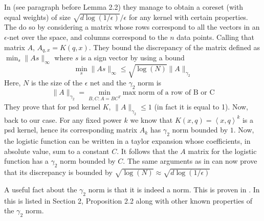 \documentclass{article} %
\newcommand{\ip}[1]{\left \langle #1 \right \rangle}
\newcommand{\eps}{\epsilon}
\begin{document}
In \cite{DBLP:journals/corr/abs-1802-01751} (see paragraph before Lemma 2.2) they manage to obtain a coreset (with equal weights) of size $\sqrt{d \log(1/\eps)}/\eps$ for any kernel with certain properties. The do so by considering a matrix whose rows correspond to all the vectors in an $\eps$-net over the space, and columns correspond to the $n$ data points. Calling that matrix $A$, $A_{q,x} = K(q,x)$. They bound the discrepancy of the matrix defined as $\min_s \|As\|_\infty$ where $s$ is a sign vector by using a bound 
$$ \min_s \|As\|_\infty \leq \sqrt{\log(N)} \|A\|_{\gamma_2} $$
Here, $N$ is the size of the $\eps$ net and the $\gamma_2$ norm is 
$$ \|A\|_{\gamma_2} = \min_{B,C: A=BC^T} \text{max norm of a row of B or C}$$
They prove that for psd kernel $K$, $\|A\|_{\gamma_2} \leq 1$ (in fact it is equal to 1). Now, back to our case. For any fixed power $k$ we know that $K(x,q)=\ip{x,q}^k$ is a psd kernel, hence its corresponding matrix $A_k$ has $\gamma_2$ norm bounded by $1$. Now, the logistic function can be written in a taylor expansion whose coefficients, in absolute value, sum to a constant $C$. It follows that the $A$ matrix for the logistic function has a $\gamma_2$ norm bounded by $C$. The same arguments as in  \cite{DBLP:journals/corr/abs-1802-01751} can now prove that its discrepancy is bounded by $\sqrt{\log(N)} \approx \sqrt{d\log(1/\eps)}$

A useful fact about the $\gamma_2$ norm is that it is indeed a norm. This is proven in \cite{tomczak1989banach}. In \cite{matouvsek2014factorization} this is listed in Section 2, Proposition 2.2 along with other known properties of the $\gamma_2$ norm. 

\end{document}
